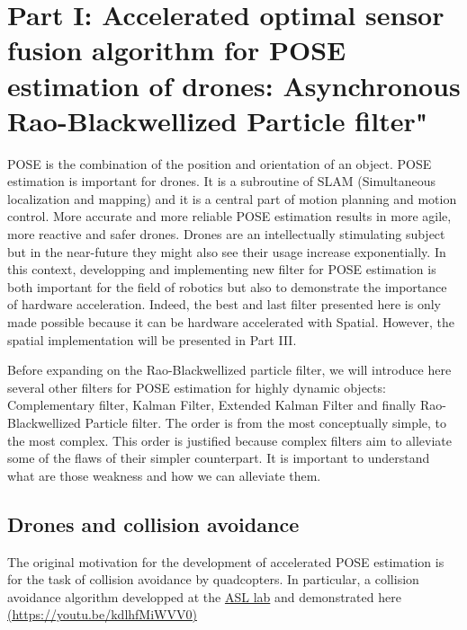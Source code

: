 \documentclass[12pt,]{article}
\begin{document}
\section{Part I: Accelerated optimal sensor fusion algorithm for POSE
estimation of drones: Asynchronous Rao-Blackwellized Particle
filter"}\label{part-i-accelerated-optimal-sensor-fusion-algorithm-for-pose-estimation-of-drones-asynchronous-rao-blackwellized-particle-filter}

POSE is the combination of the position and orientation of an object.
POSE estimation is important for drones. It is a subroutine of SLAM
(Simultaneous localization and mapping) and it is a central part of
motion planning and motion control. More accurate and more reliable POSE
estimation results in more agile, more reactive and safer drones. Drones
are an intellectually stimulating subject but in the near-future they
might also see their usage increase exponentially. In this context,
developping and implementing new filter for POSE estimation is both
important for the field of robotics but also to demonstrate the
importance of hardware acceleration. Indeed, the best and last filter
presented here is only made possible because it can be hardware
accelerated with Spatial. However, the spatial implementation will be
presented in Part III.

Before expanding on the Rao-Blackwellized particle filter, we will
introduce here several other filters for POSE estimation for highly
dynamic objects: Complementary filter, Kalman Filter, Extended Kalman
Filter and finally Rao-Blackwellized Particle filter. The order is from
the most conceptually simple, to the most complex. This order is
justified because complex filters aim to alleviate some of the flaws of
their simpler counterpart. It is important to understand what are those
weakness and how we can alleviate them.

\subsection{Drones and collision
avoidance}\label{drones-and-collision-avoidance}

The original motivation for the development of accelerated POSE
estimation is for the task of collision avoidance by quadcopters. In
particular, a collision avoidance algorithm developped at the
\href{https://asl.stanford.edu/}{ASL lab} and demonstrated here
\href{https://www.youtube.com/watch?v=kdlhfMiWVV0}{(https://youtu.be/kdlhfMiWVV0)}
\end{document}
